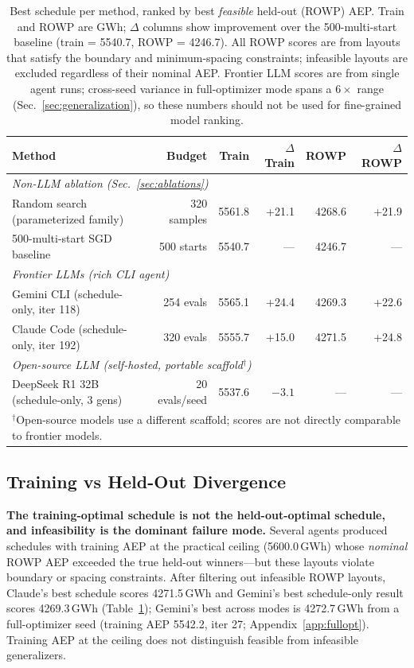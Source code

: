 \begin{table}[t]
\centering
\small
\caption{Best schedule per method, ranked by best \emph{feasible}
held-out (ROWP) AEP. Train and ROWP are GWh; $\Delta$ columns show
improvement over the 500-multi-start baseline (train = 5540.7,
ROWP = 4246.7). All ROWP scores are from layouts that satisfy the
boundary and minimum-spacing constraints; infeasible layouts are
excluded regardless of their nominal AEP. Frontier LLM scores are
from single agent runs; cross-seed variance in full-optimizer mode
spans a $6\!\times$ range (Sec.~\ref{sec:generalization}), so
these numbers should not be used for fine-grained model ranking.}
\label{tab:main}
\begin{tabular}{lrrrrr}
\toprule
\textbf{Method} & \textbf{Budget} & \textbf{Train} & \textbf{$\Delta$Train} & \textbf{ROWP} & \textbf{$\Delta$ROWP} \\
\midrule
\multicolumn{6}{l}{\emph{Non-LLM ablation (Sec.~\ref{sec:ablations})}} \\
Random search (parameterized family)           & 320 samples  & 5561.8 & +21.1 & 4268.6 & +21.9 \\
500-multi-start SGD baseline                   & 500 starts   & 5540.7 & ---    & 4246.7 & --- \\
\midrule
\multicolumn{6}{l}{\emph{Frontier LLMs (rich CLI agent)}} \\
Gemini CLI (schedule-only, iter 118)           & 254 evals    & 5565.1 & +24.4 & 4269.3 & +22.6 \\
Claude Code (schedule-only, iter 192)          & 320 evals    & 5555.7 & +15.0 & 4271.5 & +24.8 \\
\midrule
\multicolumn{6}{l}{\emph{Open-source LLM (self-hosted, portable scaffold$^\dagger$)}} \\
DeepSeek R1 32B (schedule-only, 3 gens)       & 20 evals/seed & 5537.6 & $-3.1$ & ---   & ---   \\
\multicolumn{6}{l}{\footnotesize $^\dagger$Open-source models use a different scaffold; scores are not directly comparable to frontier models.} \\
\bottomrule
\end{tabular}
\end{table}

\subsection{Training vs Held-Out Divergence}
\label{sec:divergence}

\textbf{The training-optimal schedule is not the held-out-optimal
schedule, and infeasibility is the dominant failure mode.} Several
agents produced schedules with training AEP at the practical
ceiling (5600.0\,GWh) whose \emph{nominal} ROWP AEP exceeded the
true held-out winners---but these layouts violate boundary or
spacing constraints. After filtering out infeasible ROWP layouts,
Claude's best schedule scores 4271.5\,GWh and Gemini's best
schedule-only result scores 4269.3\,GWh (Table~\ref{tab:main});
Gemini's best across modes is 4272.7\,GWh from a full-optimizer
seed (training AEP 5542.2, iter 27; Appendix~\ref{app:fullopt}).
Training AEP at the ceiling does not distinguish feasible from
infeasible generalizers.

